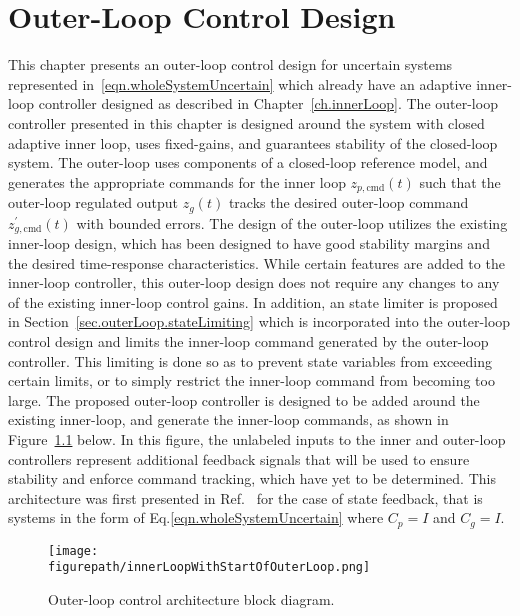 \chapter{Outer-Loop Control Design}\label{ch.outerLoop}

This chapter presents an outer-loop control design for uncertain systems represented in\ \eqref{eqn.wholeSystemUncertain} which already have an adaptive inner-loop controller designed as described in Chapter~\ref{ch.innerLoop}.
The outer-loop controller presented in this chapter is designed around the system with closed adaptive inner loop, uses fixed-gains, and guarantees stability of the closed-loop system.
The outer-loop uses components of a closed-loop reference model, and generates the appropriate commands for the inner loop $z_{p,\text{cmd}}(t)$ such that the outer-loop regulated output $z_{g}(t)$ tracks the desired outer-loop command $z_{g,\text{cmd}}^{\prime}(t)$ with bounded errors.
The design of the outer-loop utilizes the existing inner-loop design, which has been designed to have good stability margins and the desired time-response characteristics.
While certain features are added to the inner-loop controller, this outer-loop design does not require any changes to any of the existing inner-loop control gains.
In addition, an state limiter is proposed in Section~\ref{sec.outerLoop.stateLimiting} which is incorporated into the outer-loop control design and limits the inner-loop command generated by the outer-loop controller.
This limiting is done so as to prevent state variables from exceeding certain limits, or to simply restrict the inner-loop command from becoming too large.
The proposed outer-loop controller is designed to be added around the existing inner-loop, and generate the inner-loop commands, as shown in Figure~\ref{fig.innerLoopWithStartOfOuterLoop} below.
In this figure, the unlabeled inputs to the inner and outer-loop controllers represent additional feedback signals that will be used to ensure stability and enforce command tracking, which have yet to be determined.
This architecture was first presented in Ref.\ \cite{wiese.sequential.2016} for the case of state feedback, that is systems in the form of Eq.\eqref{eqn.wholeSystemUncertain} where $C_{p}=I$ and $C_{g}=I$.

\begin{figure}[H]
  \begin{center}
    \texttt{[image: \\figurepath/innerLoopWithStartOfOuterLoop.png]}
    \vspace{-0.1in}
    \caption{Outer-loop control architecture block diagram.\label{fig.innerLoopWithStartOfOuterLoop}}
  \end{center}
\end{figure}

